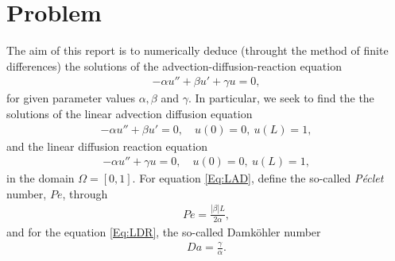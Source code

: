\documentclass[a4paper,11pt]{article}
\theoremstyle{break}
\theoremstyle{break2}
\theoremstyle{break}
\theoremstyle{break2}
\begin{document}
\section{Problem}
The aim of this report is to numerically deduce (throught the method of finite differences) the solutions of the advection-diffusion-reaction equation
\begin{align*}
-\alpha u'' + \beta u' + \gamma u = 0,
\end{align*}
for given parameter values $ \alpha,\beta $ and $ \gamma $. In particular, we seek to find the the solutions of the linear advection diffusion equation
\begin{align}\label{Eq:LAD}
-\alpha u'' + \beta u' = 0, \quad u(0) = 0,\ u(L) = 1,
\end{align}
and the linear diffusion reaction equation
\begin{align}\label{Eq:LDR}
-\alpha u'' + \gamma u = 0, \quad u(0) = 0,\ u(L) = 1,
\end{align}
in the domain $ \Omega = [0,1] $. For equation \eqref{Eq:LAD}, define the so-called \emph{P\'{e}clet} number, $ Pe $, through
\begin{align*}
Pe = \frac{|\beta|L}{2\alpha},
\end{align*}
and for the equation \eqref{Eq:LDR}, the so-called Damk\"{o}hler number
\begin{align*}
Da = \frac{\gamma}{\alpha}.
\end{align*}
\end{document}
